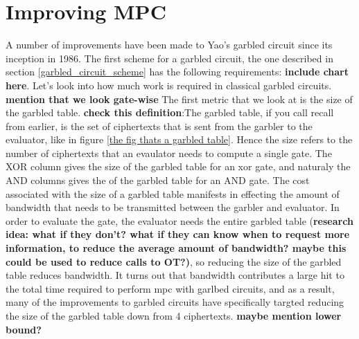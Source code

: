 \documentclass[12pt,twoside]{reedthesis}
\begin{document}
\chapter{Improving MPC}
A number of improvements have been made to Yao's garbled circuit since its inception in 1986.
The first scheme for a garbled circuit, the one described in section \ref{garbled_circuit_scheme} has the following requirements: \textbf{include chart here}.
Let's look into how much work is required in classical garbled circuits.
\textbf{mention that we look gate-wise}
The first metric that we look at is the size of the garbled table.
\textbf{check this definition}:The garbled table, if you call recall from earlier, is the set of ciphertexts that is sent from the garbler to the evaluator, like in figure \ref{the fig thats a garbled table}.
Hence the size refers to the number of ciphertexts that an evaulator needs to compute a single gate.
The XOR column gives the size of the garbled table for an xor gate, and naturaly the AND columns gives the of the garbled table for an AND gate.
The cost associated with the size of a garbled table manifests in effecting the amount of bandwidth that needs to be transmitted between the garbler and evaluator.
In order to evaluate the gate, the evaluator needs the entire garbled table (\textbf{research idea: what if they don't? what if they can know when to request more information, to reduce the average amount of bandwidth? maybe this could be used to reduce calls to OT?)}, so reducing the size of the garbled table reduces bandwidth.
It turns out that bandwidth contributes a large hit to the total time required to perform mpc with garlbed circuits, and as a result, many of the improvements to garbled circuits have specifically targted reducing the size of the garbled table down from 4 ciphertexts.
\textbf{maybe mention lower bound?}
\end{document}
